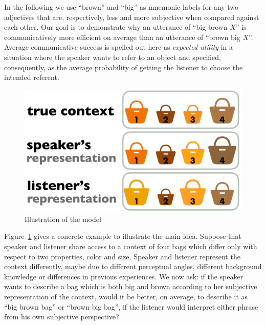 \documentclass[10pt,a4paper]{article}
\begin{document}
In the following we use ``brown'' and ``big'' as mnemonic labels for any two adjectives that are, respectively, less and more subjective when compared against each other. Our goal is to demonstrate why an utterance of ``big brown $X$'' is communicatively more efficient on average than an utterance of ``brown big $X$''. Average communicative success is spelled out here as \emph{expected utility} in a situation where the speaker wants to refer to an object and specified, consequently, as the average probability of getting the listener to choose the intended referent.

\begin{figure}[t]
  \centering
 \includegraphics[width=\linewidth]{model_picture.pdf} 
  \caption{Illustration of the model}
  \label{fig:ModelIllustration}
\end{figure}


Figure~\ref{fig:ModelIllustration} gives a concrete example to illustrate the main idea. Suppose that speaker and listener share access to a context of four bags which differ only with respect to two properties, color and size. Speaker and listener represent the context differently, maybe due to different perceptual angles, different background knowledge or differences in previous experiences. We now ask: if the speaker wants to describe a bag which is both big and brown according to her subjective representation of the context, would it be better, on average, to describe it as ``big brown bag'' or ``brown big bag'', if the listener would interpret either phrase from his own subjective perspective?
\end{document}
